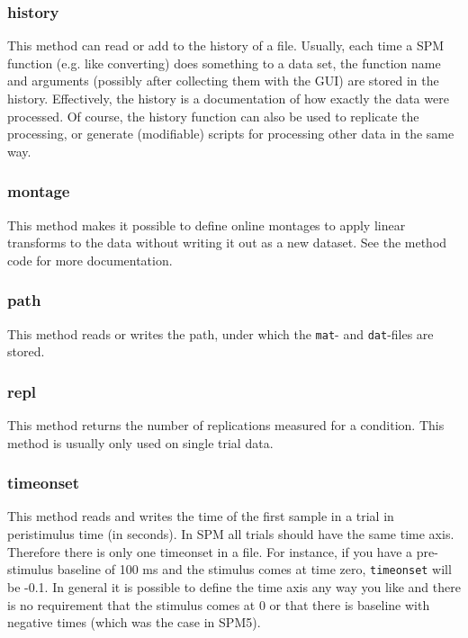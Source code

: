 \subsubsection{history}
This method can read or add to the history of a file. Usually, each time a SPM function (e.g. like converting) does something to a data set, the function name and arguments (possibly after collecting them with the GUI) are stored in the history. Effectively, the history is a documentation of how exactly the data were processed. Of course, the history function can also be used to replicate the processing, or generate (modifiable) scripts for processing other data in the same way.

\subsubsection{montage}
This method makes it possible to define online montages to apply linear transforms to the data without writing it out as a new dataset. See the method code for more documentation. 

\subsubsection{path}
This method reads or writes the path, under which the \texttt{mat}- and \texttt{dat}-files are stored.

\subsubsection{repl}
This method returns the number of replications measured for a condition. This method is usually only used on single trial data.

\subsubsection{timeonset}
This method reads and writes the time of the first sample in a trial in peristimulus time (in seconds). In SPM all trials should have the same time axis. Therefore there is only one timeonset in a file. For instance, if you have a pre-stimulus baseline of 100 ms and the stimulus comes at time zero, \texttt{timeonset} will be -0.1. In general it is possible to define the time axis any way you like and there is no requirement that the stimulus comes at 0 or that there is baseline with negative times (which was the case in SPM5).

